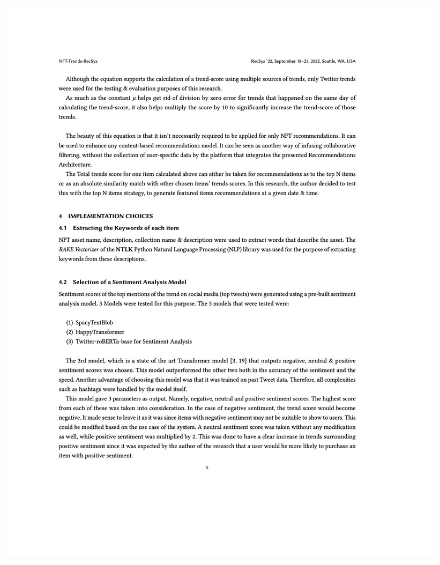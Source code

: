 \begin{figure}[h!]
\centering
\includegraphics[width=\textwidth]{images/appendix/papers/trends/Exploration of the possibility of infusing Social Media Trends into generating NFT Recommendations 5.jpeg}
\end{figure}

